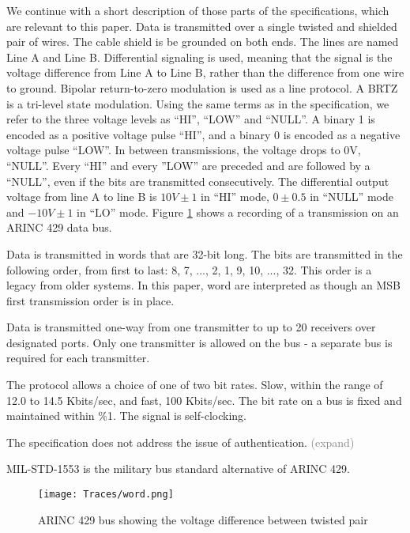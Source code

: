 \documentclass[conference]{IEEEtran}
\begin{document}
  We continue with a short description of those parts of the specifications, which are relevant to this paper. Data is transmitted over a single twisted and shielded pair of wires. The cable shield is be grounded on both ends. The lines are named Line A and Line B. Differential signaling is used, meaning that the signal is the voltage difference from Line A to Line B, rather than the difference from one wire to ground. Bipolar return-to-zero modulation is used as a line protocol. A BRTZ is a tri-level state modulation. Using the same terms as in the specification, we refer to the three voltage levels as ``HI'', ``LOW'' and ``NULL''. A binary 1 is encoded as a positive voltage pulse ``HI'', and a binary 0 is encoded as a negative voltage pulse ``LOW''. In between transmissions, the voltage drops to 0V, ``NULL''. Every ``HI'' and every ''LOW'' are preceded and are followed by a ``NULL'', even if the bits are transmitted consecutively. The differential output voltage from line A to line B is $10V \pm 1$ in ``HI'' mode, $0 \pm 0.5$ in ``NULL'' mode and $-10V \pm 1$ in ``LO'' mode.  Figure \ref{fig:word_example} shows a recording of a transmission on an ARINC 429 data bus.
  
  Data is transmitted in words that are 32-bit long. The bits are transmitted in the following order, from first to last: 8, 7, ..., 2, 1, 9, 10, ..., 32. This order is a legacy from older systems. In this paper, word are interpreted as though an MSB first transmission order is in place.
  
  Data is transmitted one-way from one transmitter to up to 20 receivers over designated ports. Only one transmitter is allowed on the bus - a separate bus is required for each transmitter.  
   
  The protocol allows a choice of one of two bit rates. Slow, within the range of 12.0 to 14.5 Kbits/sec, and fast, 100 Kbits/sec. The bit rate on a bus is fixed and maintained within \%1. The signal is self-clocking.
  
  The specification does not address the issue of authentication. \textcolor{gray}{(expand)}
   
  MIL-STD-1553 \cite{} is the military bus standard alternative of ARINC 429.
  
  \begin{figure}[t]
    \centering
    \texttt{[image: Traces/word.png]}
    \caption{ARINC 429 bus showing the voltage difference between twisted pair}
    \label{fig:word_example}
  \end{figure}
  
\end{document}
